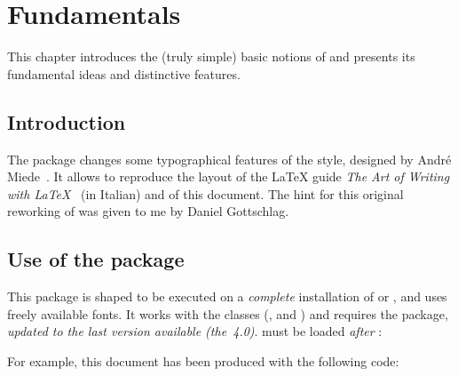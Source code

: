 \chapter{Fundamentals}
\label{chp:fundamentals}

This chapter introduces the (truly simple) basic notions of \arsclassica{} and presents its fundamental ideas and distinctive features.


\section{Introduction}

The \arsclassica{} package changes some typographical features of the \classicthesis{} style, designed by Andr\'e Miede~\citep{miede:classicthesis,pantieri:classicthesis}. It allows to reproduce the layout of the \LaTeX{} guide \emph{The Art of Writing with \LaTeX}~\citep{pantieri:art} (in Italian) and of this document. The hint for this original reworking of \classicthesis{} was given to me by Daniel Gottschlag.



\section{Use of the package}

This package is shaped to be executed on a \emph{complete} installation of \miktex{} or \texlive, and uses freely available fonts.
It works with the  classes (,  and ) and requires the  package, \emph{updated to the last version available (the~4.0)}. \arsclassica{} must be loaded \emph{after} :
\begin{code}
\documentclass[\meta{\dots\unkern}{scrreprt} %

\usepackage[\meta{\dots\unkern}{classicthesis}
\usepackage{arsclassica}


\dots*

\end{code}

For example, this document has been produced with the following code:
\begin{code}
\documentclass[10pt,a4paper,twoside,openright,titlepage,fleqn,%
               headinclude,footinclude,BCOR5mm,%
               numbers=noenddot,cleardoublepage=empty,%
               tablecaptionabove]{scrreprt}

\usepackage{\meta{\dots\unkern}
\usepackage{subfig}
\usepackage[eulerchapternumbers,subfig,beramono,%
            eulermath,pdfspacing]{classicthesis}
\usepackage{arsclassica}


\dots

\end{code}

